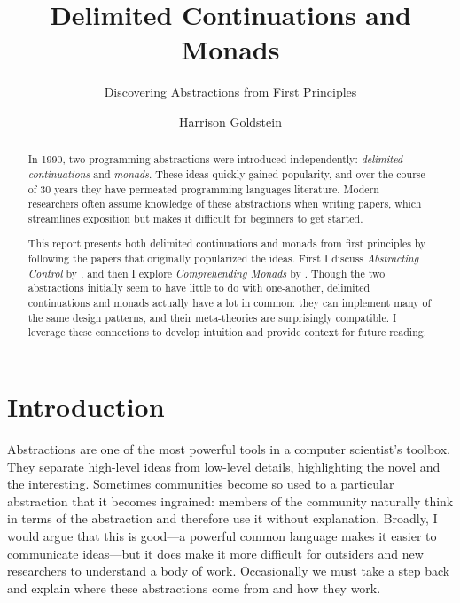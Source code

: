 \documentclass[acmsmall, nonacm, screen]{acmart}
\begin{document}
\title{Delimited Continuations and Monads}
\subtitle{Discovering Abstractions from First Principles}

\author{Harrison Goldstein}

\renewcommand{\shortauthors}{Goldstein}

\begin{abstract}
  In 1990, two programming abstractions were introduced independently: {\em delimited
  continuations} and {\em monads}. These ideas quickly gained popularity, and over the course of
  30 years they have permeated programming languages literature. Modern researchers often assume
  knowledge of these abstractions when writing papers, which streamlines exposition but makes it
  difficult for beginners to get started.
  
  This report presents both delimited continuations and monads from first principles by following
  the papers that originally popularized the ideas. First I discuss {\em Abstracting Control} by
  \citet{danvy1990abstracting}, and then I explore {\em Comprehending Monads} by
  \citet{wadler1990comprehending}. Though the two abstractions initially seem to have little to
  do with one-another, delimited continuations and monads actually have a lot in common: they can
  implement many of the same design patterns, and their meta-theories are surprisingly
  compatible. I leverage these connections to develop intuition and provide context for future
  reading.
\end{abstract}

\maketitle

\section{Introduction} \label{sec:introduction}
Abstractions are one of the most powerful tools in a computer scientist's toolbox. They separate
high-level ideas from low-level details, highlighting the novel and the interesting. Sometimes
communities become so used to a particular abstraction that it becomes ingrained: members of the
community naturally think in terms of the abstraction and therefore use it without explanation.
Broadly, I would argue that this is good---a powerful common language makes it easier to
communicate ideas---but it does make it more difficult for outsiders and new researchers to
understand a body of work. Occasionally we must take a step back and explain where these
abstractions come from and how they work.
\end{document}
